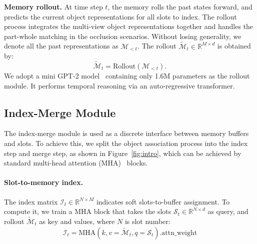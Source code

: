 \vspace{+2.5mm}
\noindent \textbf{Memory rollout.} At time step $t$, the memory rolls the past states forward, and predicts the current object representations for all slots to index. The rollout process integrates the multi-view object representations together and handles the part-whole matching in the occlusion scenarios.
Without losing generality, we denote all the past representations as  $\mathcal{M}_{<t}$. The rollout $\tilde {\mathcal{M}}_t \in \mathbb{R}^{M\times d}$ is obtained by:
\begin{equation}
    \tilde {\mathcal{M}}_t = \text{Rollout}(\mathcal{M}_{<t}).
\end{equation}
We adopt a mini GPT-2 model~\cite{radford2019language} containing only 1.6M parameters as the rollout module. It performs temporal reasoning via an auto-regressive transformer.



\subsection{Index-Merge Module}
The index-merge module is used as a discrete interface between memory buffers and slots. To achieve this, we split the object association process into the index step and merge step, as shown in Figure~\ref{fig:intro}, which can be achieved by standard multi-head attention (MHA)~\cite{vaswani2017attention} blocks. 
\vspace{-3mm}
\paragraph{Slot-to-memory index.} The index matrix %
$\mathcal{I}_{t} \in \mathbb{R}^{N\times M}$ 
indicates soft slots-to-buffer assignment. 
To compute it, 
we train a MHA
block that takes the slots $\mathcal{S}_t \in \mathbb{R}^{N\times d}$ as query, and rollout $\tilde {\mathcal{M}}_t$
as key and values, where $N$ is slot number:
\begin{equation}
    \mathcal{I}_{t}=\text{MHA}(k,v=\tilde {\mathcal{M}}_t, q=\mathcal{S}_t).\text{attn\_weight}
\end{equation}


